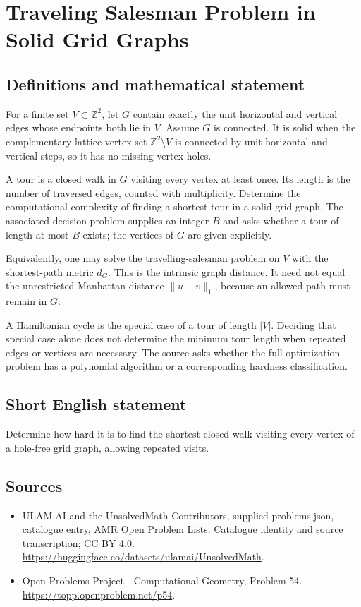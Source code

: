 \documentclass[11pt,a4paper]{article}
\begin{document}
\section*{Traveling Salesman Problem in Solid Grid Graphs}\label{statement}

\subsection{Definitions and mathematical statement}
For a finite set $V\subset\mathbb Z^2$, let $G$ contain exactly the
unit horizontal and vertical edges whose endpoints both lie in
$V$. Assume $G$ is connected. It is solid when the complementary
lattice vertex set $\mathbb Z^2\setminus V$ is connected by unit
horizontal and vertical steps, so it has no missing-vertex holes.

A tour is a closed walk in $G$ visiting every vertex at least once.
Its length is the number of traversed edges, counted with
multiplicity. Determine the computational complexity of finding
a shortest tour in a solid grid graph. The associated decision
problem supplies an integer $B$ and asks whether a tour of length
at most $B$ exists; the vertices of $G$ are given explicitly.

Equivalently, one may solve the travelling-salesman problem on
$V$ with the shortest-path metric $d_G$. This is the intrinsic
graph distance. It need not equal the unrestricted Manhattan
distance $\|u-v\|_1$, because an allowed path must remain in $G$.

A Hamiltonian cycle is the special case of a tour of length
$|V|$. Deciding that special case alone does not determine the
minimum tour length when repeated edges or vertices are necessary.
The source asks whether the full optimization problem has a
polynomial algorithm or a corresponding hardness classification.
\subsection{Short English statement}
Determine how hard it is to find the shortest closed walk visiting
every vertex of a hole-free grid graph, allowing repeated visits.
\subsection{Sources}
\begin{itemize}
\item[S1] ULAM.AI and the UnsolvedMath Contributors, supplied problems.json, catalogue entry, AMR Open Problem Lists. Catalogue identity and source transcription; CC BY 4.0.
\url{https://huggingface.co/datasets/ulamai/UnsolvedMath}.
\item[S2] Open Problems Project - Computational Geometry, Problem 54. 
\url{https://topp.openproblem.net/p54}.
\end{itemize}
\end{document}
